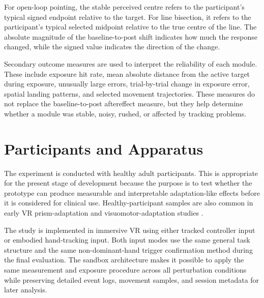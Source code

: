 For open-loop pointing, the stable perceived centre refers to the participant's typical signed endpoint relative to the target. For line bisection, it refers to the participant's typical selected midpoint relative to the true centre of the line. The absolute magnitude of the baseline-to-post shift indicates how much the response changed, while the signed value indicates the direction of the change.

Secondary outcome measures are used to interpret the reliability of each module. These include exposure hit rate, mean absolute distance from the active target during exposure, unusually large errors, trial-by-trial change in exposure error, spatial landing patterns, and selected movement trajectories. These measures do not replace the baseline-to-post aftereffect measure, but they help determine whether a module was stable, noisy, rushed, or affected by tracking problems.

\section{Participants and Apparatus}
\label{sec:method-participants-apparatus}

The experiment is conducted with healthy adult participants. This is appropriate for the present stage of development because the purpose is to test whether the prototype can produce measurable and interpretable adaptation-like effects before it is considered for clinical use. Healthy-participant samples are also common in early VR prism-adaptation and visuomotor-adaptation studies \cite{Ramos2019,cho2022feasibility,gerken2025sense,anan2025comparative}.

The study is implemented in immersive VR using either tracked controller input or embodied hand-tracking input. Both input modes use the same general task structure and the same non-dominant-hand trigger confirmation method during the final evaluation. The sandbox architecture makes it possible to apply the same measurement and exposure procedure across all perturbation conditions while preserving detailed event logs, movement samples, and session metadata for later analysis.
